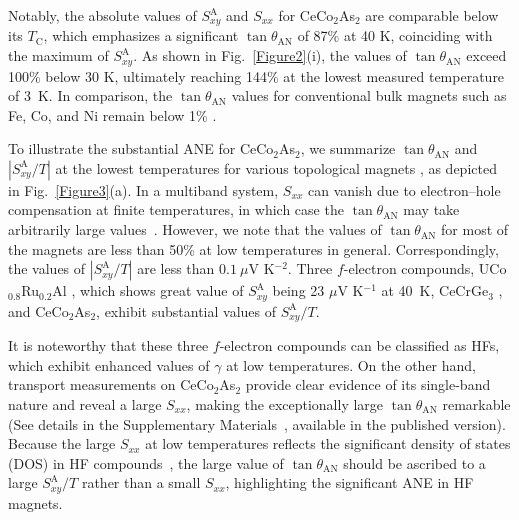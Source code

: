 \documentclass[aps,prl,preprint,superscriptaddress]{revtex4-2}
\begin{document}
Notably, the absolute values of $S^{\mathrm{A}}_{xy}$ and $S_{xx}$ for CeCo$_2$As$_2$ are comparable below its $T_{\mathrm{C}}$, which emphasizes a significant $\tan\theta_{\mathrm{AN}}$ of 87\% at 40 K, coinciding with the maximum of $S^{\mathrm{A}}_{xy}$.
As shown in Fig.~\ref{Figure2}(i), the values of $\tan\theta_{\mathrm{AN}}$ exceed 100\% below 30 K, ultimately reaching 144\% at the lowest measured temperature of 3~K.
In comparison, the $\tan\theta_{\mathrm{AN}}$ values for conventional bulk magnets such as Fe, Co, and Ni remain below 1\% \cite{Chuang2017FeCoNi}.


To illustrate the substantial ANE for CeCo$_2$As$_2$, we summarize $\tan\theta_{\mathrm{AN}}$ and $\left|S^{\mathrm{A}}_{xy}/T\right|$ at the lowest temperatures for various topological magnets \cite{Mn3SnIkhlas2017,Co2MnGaSakai2018,Co3Sn2S2Guin2018,Fe3GeTe2Xu2019,Fe3GaSakai2020,Mn3GeXu2020,Fe3Sn2Zhang2021,UCoRuAlAsaba2021,YbMnBi2Pan2022,Fe3SnChen2022,CeCrGe3Li2024}, as depicted in Fig.~\ref{Figure3}(a).
In a multiband system, $S_{xx}$ can vanish due to electron–hole compensation at finite temperatures, in which case the $\tan\theta_{\mathrm{AN}}$ may take arbitrarily large values~\cite{Mn3SnIkhlas2017, Fe3Sn2Zhang2021, UCoRuAlAsaba2021}.
However, we note that the values of  $\tan\theta_{\mathrm{AN}}$ for most of the magnets are less than 50\% at low temperatures in general.
Correspondingly, the values of  $\left|S^{\mathrm{A}}_{xy}/T\right|$ are less than $0.1~\mu$V K$^{-2}$.
Three $f$-electron compounds, UCo$_{0.8}$Ru$_{0.2}$Al \cite{UCoRuAlAsaba2021}, which shows great value of $S^{\mathrm{A}}_{xy}$ being 23 $\mu$V K$^{-1}$ at 40~K, CeCrGe$_3$ \cite{CeCrGe3Li2024}, and CeCo$_2$As$_2$, exhibit substantial values of $S^{\mathrm{A}}_{xy}/T$.

It is noteworthy that these three $f$-electron compounds can be classified as HFs, which exhibit enhanced values of $\gamma$ at low temperatures.
On the other hand, transport measurements on CeCo$_2$As$_2$ provide clear evidence of its single-band nature and reveal a large $S_{xx}$, making the exceptionally large $\tan\theta_{\mathrm{AN}}$ remarkable (See details in the Supplementary Materials~\cite{SM}, available in the published version).
Because the large $S_{xx}$ at low temperatures reflects the significant density of states (DOS) in HF compounds~\cite{SgammaBehnia2004}, the large value of $\tan\theta_{\mathrm{AN}}$ should be ascribed to a large $S^{\mathrm{A}}_{xy}/T$ rather than a small $S_{xx}$, highlighting the significant ANE in HF magnets.
\end{document}
